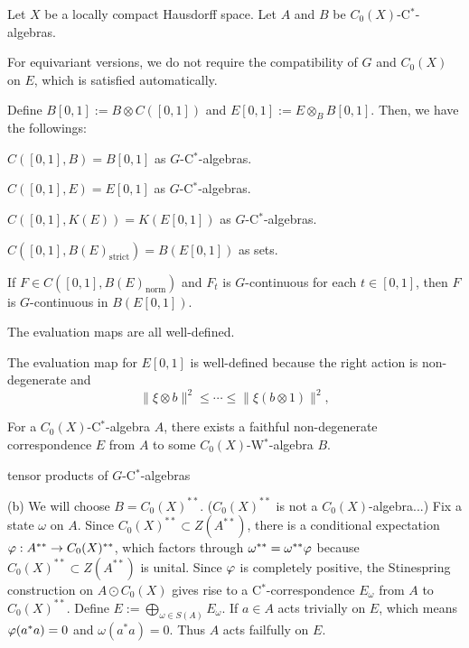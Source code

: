 \documentclass{../../large}
\begin{document}
\begin{prb}
Let $X$ be a locally compact Hausdorff space.
Let $A$ and $B$ be $C_0(X)$-C$^*$-algebras.


For equivariant versions, we do not require the compatibility of $G$ and $C_0(X)$ on $E$, which is satisfied automatically.


Define $B[0,1]:=B\otimes C([0,1])$ and $E[0,1]:=E\otimes_BB[0,1]$.
Then, we have the followings:
\begin{parts}
\item $C([0,1],B)=B[0,1]$ as $G$-C$^*$-algebras.
\item $C([0,1],E)=E[0,1]$ as $G$-C$^*$-algebras.
\item $C([0,1],K(E))=K(E[0,1])$ as $G$-C$^*$-algebras.
\item $C([0,1],B(E)_{\mathrm{strict}})=B(E[0,1])$ as sets.
\item If $F\in C([0,1],B(E)_{\mathrm{norm}})$ and $F_t$ is $G$-continuous for each $t\in[0,1]$, then $F$ is $G$-continuous in $B(E[0,1])$.
\item The evaluation maps are all well-defined.
\end{parts}

The evaluation map for $E[0,1]$ is well-defined because the right action is non-degenerate and
\[\|\xi\otimes b\|^2\le\cdots\le\|\xi(b\otimes1)\|^2,\]

\begin{parts}
\item 
\item For a $C_0(X)$-C$^*$-algebra $A$, there exists a faithful non-degenerate correspondence $E$ from $A$ to some $C_0(X)$-W$^*$-algebra $B$.
\item tensor products of $G$-C$^*$-algebras
\end{parts}
\end{prb}
\begin{pf}


(b)
We will choose $B=C_0(X)^{**}$. ($C_0(X)^{**}$ is not a $C_0(X)$-algebra...)
Fix a state $\omega$ on $A$.
Since $C_0(X)^{**}\subset Z(A^{**})$, there is a conditional expectation $\varphi:A^{**}\to C_0(X)^{**}$, which factors through $\omega^{**}=\omega^{**}\varphi$ because $C_0(X)^{**}\subset Z(A^{**})$ is unital.
Since $\varphi$ is completely positive, the Stinespring construction on $A\odot C_0(X)$ gives rise to a C$^*$-correspondence $E_\omega$ from $A$ to $C_0(X)^{**}$.
Define $E:=\bigoplus_{\omega\in S(A)}E_\omega$.
If $a\in A$ acts trivially on $E$, which means $\varphi(a^*a)=0$ and $\omega(a^*a)=0$.
Thus $A$ acts failfully on $E$.

\end{pf}
\end{document}
